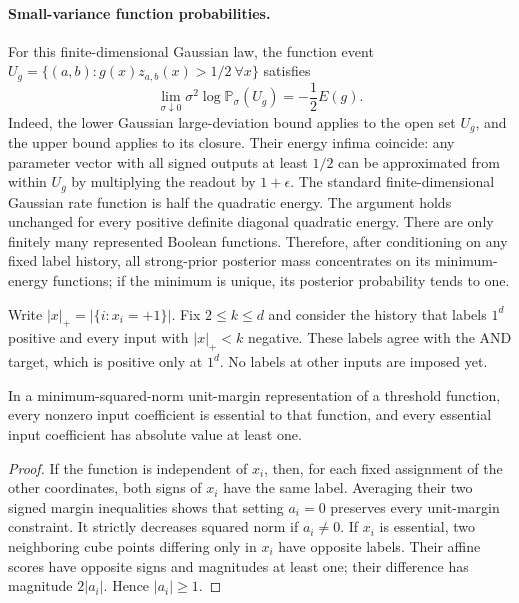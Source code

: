 \paragraph{Small-variance function probabilities.}
For this finite-dimensional Gaussian law, the function event
$U_g=\{(a,b):g(x)z_{a,b}(x)>1/2\ \forall x\}$ satisfies
\begin{equation}\label{eq:affine-rate}
 \lim_{\sigma\downarrow0}\sigma^2\log\mathbb P_\sigma(U_g)
 =-\frac12 E(g).
\end{equation}
Indeed, the lower Gaussian large-deviation bound applies to the open
set $U_g$, and the upper bound applies to its closure. Their energy
infima coincide: any parameter vector with all signed outputs at
least $1/2$ can be approximated from within $U_g$ by multiplying the
readout by $1+\epsilon$. The standard finite-dimensional Gaussian
rate function is half the quadratic energy. The argument holds
unchanged for every positive definite diagonal quadratic energy.
There are only finitely many represented Boolean functions. Therefore,
after conditioning on any fixed label history, all strong-prior
posterior mass concentrates on its minimum-energy functions; if the
minimum is unique, its posterior probability tends to one.

Write $|x|_+=|\{i:x_i=+1\}|$. Fix $2\le k\le d$ and consider the
history that labels $1^d$ positive and every input with $|x|_+<k$
negative. These labels agree with the AND target, which is positive
only at $1^d$. No labels at other inputs are imposed yet.

\begin{lemma}\label{lem:and-essential}
In a minimum-squared-norm unit-margin representation of a threshold
function, every nonzero input coefficient is essential to that function,
and every essential input coefficient has absolute value at least one.
\end{lemma}
\begin{proof}
If the function is independent of $x_i$, then, for each fixed assignment
of the other coordinates, both signs of $x_i$ have the same label.
Averaging their two signed margin inequalities shows that setting
$a_i=0$ preserves every unit-margin constraint. It strictly decreases
squared norm if $a_i\ne0$. If $x_i$ is essential, two neighboring cube
points differing only in $x_i$ have opposite labels. Their affine scores
have opposite signs and magnitudes at least one; their difference has
magnitude $2|a_i|$. Hence $|a_i|\ge1$.
\end{proof}

